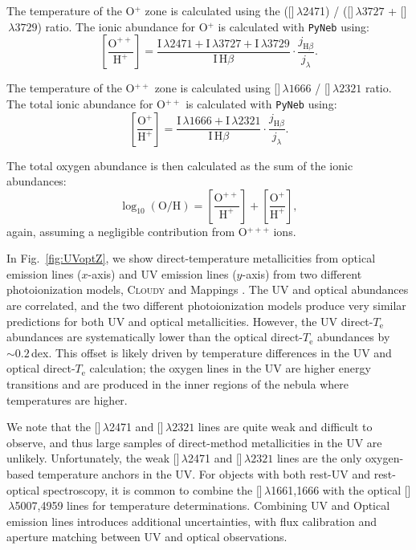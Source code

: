 \documentclass[trackchanges, preprint2]{aastex62}
\newcommand{\Cloudy}{\textsc{Cloudy}\xspace}
\newcommand{\oiii}{[\ion{O}{3}]}
\newcommand{\oii}{[\ion{O}{2}]}
\newcommand{\Te}{\ensuremath{T_{\mathrm{e}}}\xspace}
\begin{document}
The temperature of the O$^{+}$ zone is calculated using the (\oii$\,\lambda$2471) / (\oii$\,\lambda 3727$ + \oii$\,\lambda 3729$) ratio. The ionic abundance for O$^{+}$ is calculated with {\tt PyNeb} using:
\begin{equation}
    \left[ \frac{\mathrm{O}^{++}}{\mathrm{H}^{+}} \right] = \frac{\mathrm{I}\,\lambda 2471 +\mathrm{I}\,\lambda 3727 + \mathrm{I}\,\lambda 3729}{\mathrm{I}\,\mathrm{H}\beta} \cdot \frac{j_{\mathrm{H}\beta}}{j_{\lambda}}.
\end{equation}

The temperature of the O$^{++}$ zone is calculated using \oiii$\,\lambda1666$ / \oiii$\,\lambda2321$ ratio. The total ionic abundance for O$^{++}$ is calculated with {\tt PyNeb} using:
\begin{equation}
    \left[ \frac{\mathrm{O}^{+}}{\mathrm{H}^{+}} \right] = \frac{\mathrm{I}\,\lambda 1666 +\mathrm{I}\,\lambda 2321}{\mathrm{I}\,\mathrm{H}\beta} \cdot \frac{j_{\mathrm{H}\beta}}{j_{\lambda}}.
\end{equation}

The total oxygen abundance is then calculated as the sum of the ionic abundances:
\begin{equation}
    \log_{10}(\mathrm{O}/\mathrm{H}) = \left[ \frac{\mathrm{O}^{++}}{\mathrm{H}^{+}} \right] + \left[ \frac{\mathrm{O}^{+}}{\mathrm{H}^{+}} \right],
\end{equation}
again, assuming a negligible contribution from O$^{+++}$ ions.

In Fig.~\ref{fig:UVoptZ}, we show direct-temperature metallicities from optical emission lines ($x$-axis) and UV emission lines ($y$-axis) from two different photoionization models, \Cloudy \citep[circles;][]{Byler+2018} and {\sc Mappings} \citep[squares;][]{Kewley+2019}. The UV and optical abundances are correlated, and the two different photoionization models produce very similar predictions for both UV and optical metallicities. However, the UV direct-\Te abundances are systematically lower than the optical direct-\Te abundances by $\sim0.2$\,dex. This offset is likely driven by temperature differences in the UV and optical direct-\Te calculation; the oxygen lines in the UV are higher energy transitions and are produced in the inner regions of the nebula where temperatures are higher.

We note that the \oii$\,\lambda$2471 and \oiii$\,\lambda2321$ lines are quite weak and difficult to observe, and thus large samples of direct-method metallicities in the UV are unlikely. Unfortunately, the weak \oii$\,\lambda$2471 and \oiii$\,\lambda2321$ lines are the only oxygen-based temperature anchors in the UV. For objects with both rest-UV and rest-optical spectroscopy, it is common to combine the \oiii$\,\lambda$1661,1666 with the optical \oiii$\,\lambda$5007,4959 lines for temperature determinations. Combining UV and Optical emission lines introduces additional uncertainties, with flux calibration and aperture matching between UV and optical observations.
\end{document}
